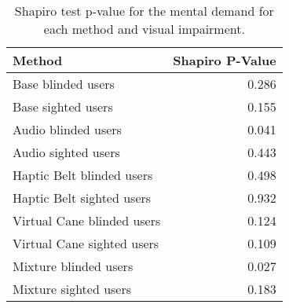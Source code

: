 
\begin{table}[!htb]
\centering
\caption{Shapiro test p-value for the mental demand for each method and visual impairment.}
\label{tab:shapiro_mental_demand}
\begin{tabular}{lr}
\toprule
                    Method &  Shapiro P-Value \\
\midrule
        Base blinded users &            0.286 \\
        Base sighted users &            0.155 \\
       Audio blinded users &            0.041 \\
       Audio sighted users &            0.443 \\
 Haptic Belt blinded users &            0.498 \\
 Haptic Belt sighted users &            0.932 \\
Virtual Cane blinded users &            0.124 \\
Virtual Cane sighted users &            0.109 \\
     Mixture blinded users &            0.027 \\
     Mixture sighted users &            0.183 \\
\bottomrule
\end{tabular}
\end{table}

